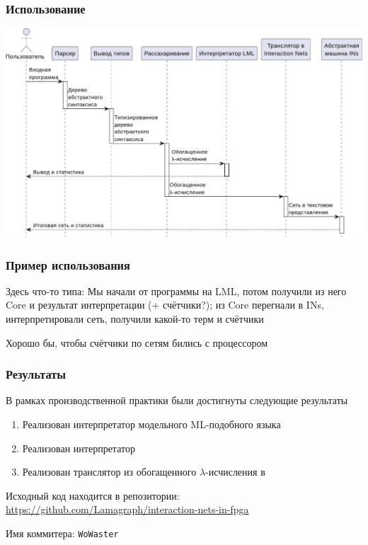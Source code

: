 \documentclass
  [ russian
  , aspectratio=169 %
  ] {beamer}
\begin{document}
\begin{frame}
    \frametitle{Использование}

    \begin{center}
        \includegraphics[width=0.8\linewidth]{figures/using.pdf}
    \end{center}

\end{frame}

\begin{frame}
    \frametitle{Пример использования}

    Здесь что-то типа: Мы начали от программы на LML, потом получили из него Core и результат интерпретации (+ счётчики?); из Core перегнали в INs, интерпретировали сеть, получили какой-то терм и счётчики

    Хорошо бы, чтобы счётчики по сетям бились с процессором

\end{frame}

\begin{frame}
    \frametitle{Результаты}
    В рамках производственной практики были достигнуты следующие результаты
    \begin{enumerate}
        \item Реализован интерпретатор модельного ML-подобного языка
        \item Реализован интерпретатор \INs{}
        \item Реализован транслятор из обогащенного $\lambda$-исчисления в \INs{}
    \end{enumerate}

    \vspace{1em}

    Исходный код находится в репозитории: \url{https://github.com/Lamagraph/interaction-nets-in-fpga}

    Имя коммитера: \texttt{WoWaster}
\end{frame}
\end{document}
